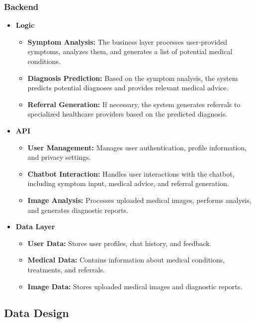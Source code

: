 \subsubsection{Backend}
\begin{itemize}
    \item \textbf{Logic}
    \begin{itemize}
        
        \item \textbf{Symptom Analysis: } The business layer processes user-provided symptoms, analyzes them, and generates a list of potential medical conditions.
        \item \textbf{Diagnosis Prediction: } Based on the symptom analysis, the system predicts potential diagnoses and provides relevant medical advice.
        \item \textbf{Referral Generation: } If necessary, the system generates referrals to specialized healthcare providers based on the predicted diagnosis.

    \end{itemize}

    \item \textbf{API}
    \begin{itemize}
        \item \textbf{User Management: } Manages user authentication, profile information, and privacy settings.
        \item \textbf{Chatbot Interaction: } Handles user interactions with the chatbot, including symptom input, medical advice, and referral generation.
        \item \textbf{Image Analysis: } Processes uploaded medical images, performs analysis, and generates diagnostic reports.
    \end{itemize}

    \item \textbf{Data Layer}
    \begin{itemize}
        \item \textbf{User Data: } Stores user profiles, chat history, and feedback.
        \item \textbf{Medical Data: } Contains information about medical conditions, treatments, and referrals.
        \item \textbf{Image Data: } Stores uploaded medical images and diagnostic reports.
    \end{itemize}
\end{itemize}


\subsection{Data Design}

